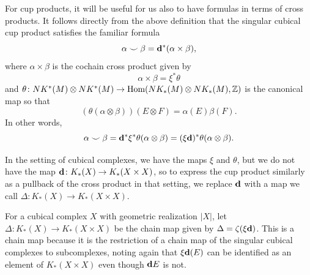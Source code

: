 For cup products, it will be useful for us also to have formulas in terms of cross products.
It follows directly from the above definition that the singular cubical cup product satisfies the familiar formula $$\alpha \smile \beta = \mathbf{d}^*(\alpha \times \beta),$$
where $\alpha \times \beta$ is the cochain cross product given by $$\alpha \times \beta = \xi^*\theta$$
and $\theta \colon NK^*(M) \otimes NK^*(M) \to \textup{Hom}(NK_*(M) \otimes NK_*(M),\mathbb{Z})$ is the canonical map so that $$(\theta(\alpha \otimes \beta))(E \otimes F) = \alpha(E)\beta(F).$$
In other words, $$\alpha \smile \beta = \mathbf{d}^* \xi^* \theta(\alpha \otimes \beta) = (\xi \mathbf{d})^*\theta (\alpha \otimes \beta).$$

In the setting of cubical complexes, we have the maps $\xi$ and $\theta$, but we do not have the map $\mathbf{d} \colon K_*(X) \to K_*(X \times X) $, so to express the cup product similarly as a pullback of the cross product in that setting, we replace $\mathbf{d}$ with a map we call $\Delta \colon K_*(X) \to K_*(X \times X)$.

\begin{definition}\label{D: Delta}
	For a cubical complex $X$ with geometric realization $|X|$, let $\Delta \colon K_*(X) \to K_*(X \times X)$ be the chain map given by $\Delta = \zeta(\xi\mathbf{d})$.
	This is a chain map because it is the restriction of a chain map of the singular cubical complexes to subcomplexes, noting again that $\xi\mathbf{d}(E)$ can be identified as an element of $K_*(X \times X)$ even though $\mathbf{d} E$ is not.
\end{definition}

